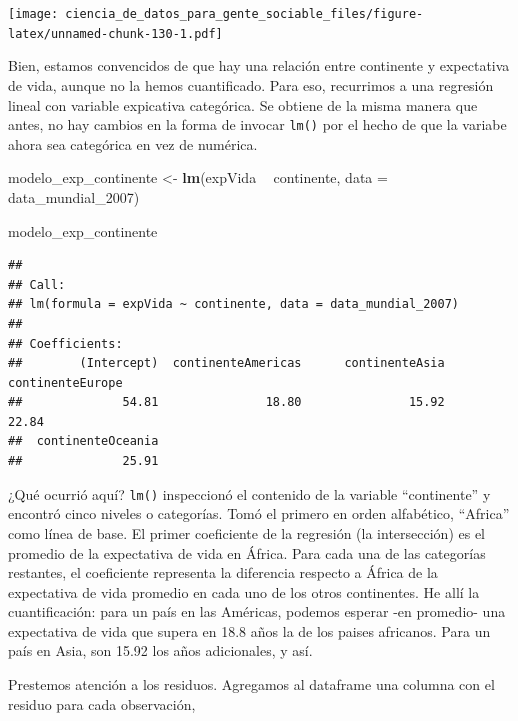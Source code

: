 \documentclass[spanish,]{book}
\newenvironment{Shaded}{\begin{snugshade}}{\end{snugshade}}
\newcommand{\DataTypeTok}[1]{\textcolor[rgb]{0.13,0.29,0.53}{#1}}
\newcommand{\DecValTok}[1]{\textcolor[rgb]{0.00,0.00,0.81}{#1}}
\newcommand{\KeywordTok}[1]{\textcolor[rgb]{0.13,0.29,0.53}{\textbf{#1}}}
\newcommand{\NormalTok}[1]{#1}
\newcommand{\OperatorTok}[1]{\textcolor[rgb]{0.81,0.36,0.00}{\textbf{#1}}}
\newcommand{\StringTok}[1]{\textcolor[rgb]{0.31,0.60,0.02}{#1}}
\begin{document}
\texttt{[image: ciencia\_de\_datos\_para\_gente\_sociable\_files/figure-latex/unnamed-chunk-130-1.pdf]}

Bien, estamos convencidos de que hay una relación entre continente y expectativa de vida, aunque no la hemos cuantificado. Para eso, recurrimos a una regresión lineal con variable expicativa categórica. Se obtiene de la misma manera que antes, no hay cambios en la forma de invocar \texttt{lm()} por el hecho de que la variabe ahora sea categórica en vez de numérica.

\begin{Shaded}
\begin{Highlighting}[]
\NormalTok{modelo_exp_continente <-}\StringTok{ }\KeywordTok{lm}\NormalTok{(expVida }\OperatorTok{~}\StringTok{ }\NormalTok{continente, }\DataTypeTok{data =}\NormalTok{ data_mundial_}\DecValTok{2007}\NormalTok{)}


\NormalTok{modelo_exp_continente}
\end{Highlighting}
\end{Shaded}

\begin{verbatim}
## 
## Call:
## lm(formula = expVida ~ continente, data = data_mundial_2007)
## 
## Coefficients:
##        (Intercept)  continenteAmericas      continenteAsia    continenteEurope  
##              54.81               18.80               15.92               22.84  
##  continenteOceania  
##              25.91
\end{verbatim}

¿Qué ocurrió aquí? \texttt{lm()} inspeccionó el contenido de la variable ``continente'' y encontró cinco niveles o categorías. Tomó el primero en orden alfabético, ``Africa'' como línea de base. El primer coeficiente de la regresión (la intersección) es el promedio de la expectativa de vida en África. Para cada una de las categorías restantes, el coeficiente representa la diferencia respecto a África de la expectativa de vida promedio en cada uno de los otros continentes. He allí la cuantificación: para un país en las Américas, podemos esperar -en promedio- una expectativa de vida que supera en 18.8 años la de los paises africanos. Para un país en Asia, son 15.92 los años adicionales, y así.

Prestemos atención a los residuos. Agregamos al dataframe una columna con el residuo para cada observación,

\begin{Shaded}
\end{Shaded}
\end{document}
